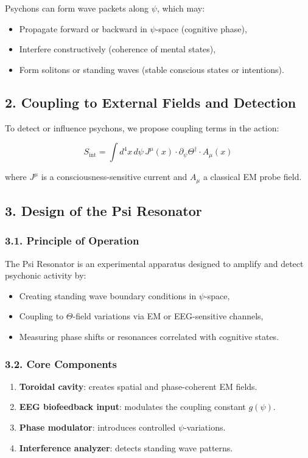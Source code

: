 Psychons can form wave packets along \(\psi\), which may:
\begin{itemize}
  \item Propagate forward or backward in \(\psi\)-space (cognitive phase),
  \item Interfere constructively (coherence of mental states),
  \item Form solitons or standing waves (stable conscious states or intentions).
\end{itemize}

\subsection*{2. Coupling to External Fields and Detection}

To detect or influence psychons, we propose coupling terms in the action:

\[
S_{\text{int}} = \int d^4x \, d\psi \, J^\mu(x) \cdot \partial_\psi \Theta^\dagger \cdot A_\mu(x)
\]

where \(J^\mu\) is a consciousness-sensitive current and \(A_\mu\) a classical EM probe field.

\subsection*{3. Design of the Psi Resonator}

\subsubsection*{3.1. Principle of Operation}

The Psi Resonator is an experimental apparatus designed to amplify and detect psychonic activity by:

\begin{itemize}
  \item Creating standing wave boundary conditions in \(\psi\)-space,
  \item Coupling to \(\Theta\)-field variations via EM or EEG-sensitive channels,
  \item Measuring phase shifts or resonances correlated with cognitive states.
\end{itemize}

\subsubsection*{3.2. Core Components}

\begin{enumerate}
  \item \textbf{Toroidal cavity}: creates spatial and phase-coherent EM fields.
  \item \textbf{EEG biofeedback input}: modulates the coupling constant \(g(\psi)\).
  \item \textbf{Phase modulator}: introduces controlled \(\psi\)-variations.
  \item \textbf{Interference analyzer}: detects standing wave patterns.
\end{enumerate}

